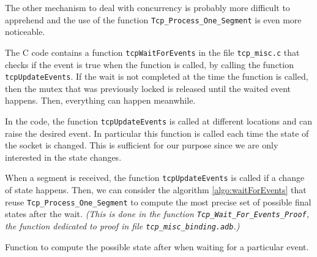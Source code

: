 \documentclass[a4paper, 10pt]{article}
\begin{document}
    The other mechanism to deal with concurrency is probably more difficult to apprehend and the
    use of the function \lstinline[language=Ada]{Tcp_Process_One_Segment} is even more noticeable.
    
    The C code contains a function \lstinline[language=C]{tcpWaitForEvents} in the file \texttt{tcp\_misc.c}
    that checks if the event is true when the function is called, by calling the function
    \lstinline[language=C]{tcpUpdateEvents}. If the wait is not completed at the time the function is
    called, then the mutex that was previously locked is released until the waited event happens.
    Then, everything can happen meanwhile.
    
    In the code, the function \lstinline[language=C]{tcpUpdateEvents} is called at different locations
    and can raise the desired event. In particular this function is called each time the state of
    the socket is changed. This is sufficient for our purpose since we are only interested in the state
    changes.

    When a segment is received, the function \lstinline[language=C]{tcpUpdateEvents} is called if a
    change of state happens. Then, we can consider the algorithm \ref{algo:waitForEvents} that reuse
    \lstinline[language=Ada]{Tcp_Process_One_Segment} to compute the most precise set of possible
    final states after the wait. \textit{(This is done in the function \lstinline[language=Ada]{Tcp_Wait_For_Events_Proof},
    the function dedicated to proof in file \texttt{tcp\_misc\_binding.adb}.)}

    \begin{algorithm}[t]
        \caption{Function to compute the possible state after when waiting for a particular event.}
        \label{algo:waitForEvents}
    \end{algorithm}
\end{document}
